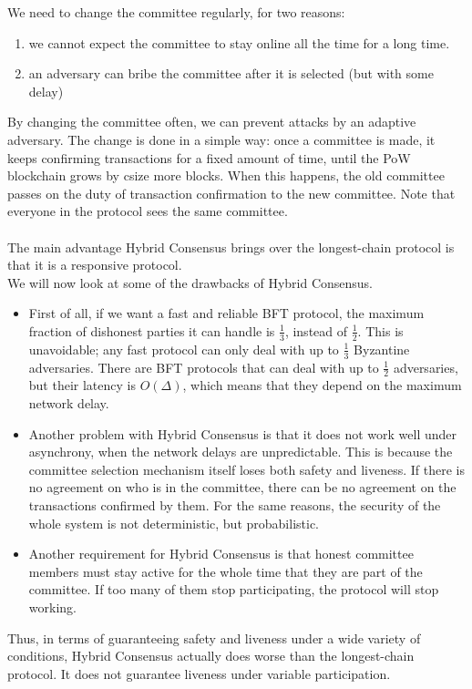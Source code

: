 We need to change the committee regularly, for two reasons:
\begin{enumerate}
	\item we cannot expect the committee to stay online all the time for a long time.
	\item an adversary can bribe the committee after it is selected (but with some delay)
\end{enumerate}
By changing the committee often, we can prevent attacks by an adaptive adversary. The change is done in a simple way: once a committee is made, it keeps confirming transactions for a fixed amount of time, until the PoW blockchain grows by csize more blocks. When this happens, the old committee passes on the duty of transaction confirmation to the new committee. Note that everyone in the protocol sees the same committee.\\\\
The main advantage Hybrid Consensus brings over the longest-chain protocol is that it is a responsive protocol.\\
We will now look at some of the drawbacks of Hybrid Consensus.
\begin{itemize}
	\item  First of all, if we want a fast and reliable BFT protocol, the maximum fraction of dishonest parties it can handle is $\frac{1}{3}$, instead of $\frac{1}{2}$. This is unavoidable; any fast protocol can only deal with up to $\frac{1}{3}$ Byzantine adversaries. There are BFT protocols that can deal with up to $\frac{1}{2}$ adversaries, but their latency is $O(\Delta)$, which means that they depend on the maximum network delay.
	\item Another problem with Hybrid Consensus is that it does not work well under asynchrony, when the network delays are unpredictable. This is because the committee selection mechanism itself loses both safety and liveness. If there is no agreement on who is in the committee, there can be no agreement on the transactions confirmed by them. For the same reasons, the security of the whole system is not deterministic, but probabilistic.
	\item Another requirement for Hybrid Consensus is that honest committee members must stay active for the whole time that they are part of the committee. If too many of them stop participating, the protocol will stop working.
\end{itemize}
Thus, in terms of guaranteeing safety and liveness under a wide variety of conditions, Hybrid Consensus actually does worse than the longest-chain protocol. It does not guarantee liveness under variable participation.
	
